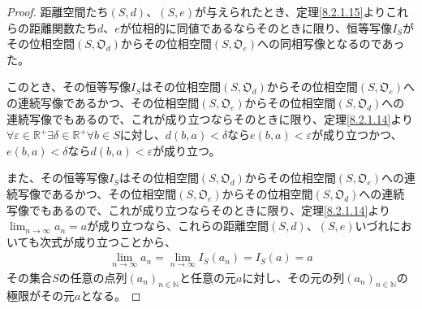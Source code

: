 \documentclass[dvipdfmx]{jsarticle}
\begin{document}
\begin{proof} 距離空間たち$(S,d)$、$(S,e)$が与えられたとき、定理\ref{8.2.1.15}よりこれらの距離関数たち$d$、$e$が位相的に同値であるならそのときに限り、恒等写像$I_{S}$がその位相空間$\left( S,\mathfrak{O}_{d} \right)$からその位相空間$\left( S,\mathfrak{O}_{e} \right)$への同相写像となるのであった。\par
このとき、その恒等写像$I_{S}$はその位相空間$\left( S,\mathfrak{O}_{d} \right)$からその位相空間$\left( S,\mathfrak{O}_{e} \right)$への連続写像であるかつ、その位相空間$\left( S,\mathfrak{O}_{e} \right)$からその位相空間$\left( S,\mathfrak{O}_{d} \right)$への連続写像でもあるので、これが成り立つならそのときに限り、定理\ref{8.2.1.14}より$\forall\varepsilon \in \mathbb{R}^{+}\exists\delta \in \mathbb{R}^{+}\forall b \in S$に対し、$d(b,a) < \delta$なら$e(b,a) < \varepsilon$が成り立つかつ、$e(b,a) < \delta$なら$d(b,a) < \varepsilon$が成り立つ。\par
また、その恒等写像$I_{S}$はその位相空間$\left( S,\mathfrak{O}_{d} \right)$からその位相空間$\left( S,\mathfrak{O}_{e} \right)$への連続写像であるかつ、その位相空間$\left( S,\mathfrak{O}_{e} \right)$からその位相空間$\left( S,\mathfrak{O}_{d} \right)$への連続写像でもあるので、これが成り立つならそのときに限り、定理\ref{8.2.1.14}より$\lim_{n \rightarrow \infty}a_{n} = a$が成り立つなら、これらの距離空間$(S,d)$、$(S,e)$いづれにおいても次式が成り立つことから、
\begin{align*}
\lim_{n \rightarrow \infty}a_{n} = \lim_{n \rightarrow \infty}{I_{S}\left( a_{n} \right)} = I_{S}(a) = a
\end{align*}
その集合$S$の任意の点列$\left( a_{n} \right)_{n \in \mathbb{N}}$と任意の元$a$に対し、その元の列$\left( a_{n} \right)_{n \in \mathbb{N}}$の極限がその元$a$となる。
\end{proof}
\end{document}
